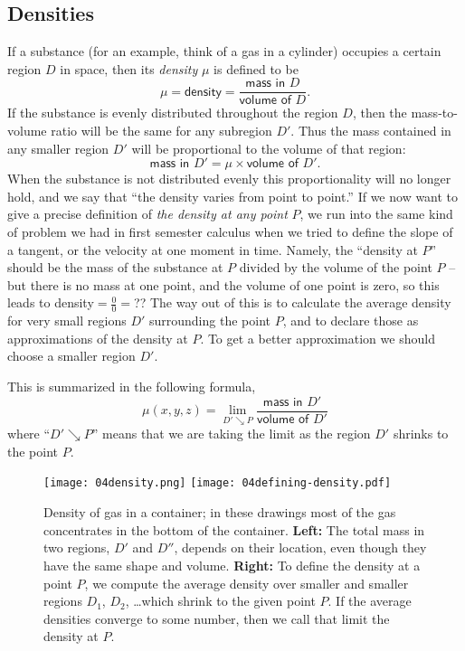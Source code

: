 \subsection{Densities}  
If a substance (for an example, think of a gas in a cylinder) occupies
a certain region $D$ in space, then its \emph{density} $\mu$ is defined to
be 
\[
\mu = \textsf{density} = \frac{\textsf{mass in }D}{\textsf{volume of }D}.
\]
If the substance is evenly distributed throughout the region
$D$, then the mass-to-volume ratio will be the same for any subregion
$D'$.  Thus the mass contained in any smaller region $D'$ will be
proportional to the volume of that region:
\[
\textsf{mass in }D' = \mu \times \textsf{volume of }D'.
\]
When the substance is not distributed evenly this proportionality will
no longer hold, and we say that ``the density varies from point to point.''
If we now want to give a precise definition of \emph{the density at any point}
$P$, we run into the same kind of problem we had in first semester
calculus when we tried to define
the slope of a tangent, or the velocity at one moment in time.  Namely, 
the ``density at $P$'' should be the mass of the substance at $P$ divided
by the volume of the point $P$ -- but there is no mass at one point, and the
volume of one point is zero, so this leads to density$=\frac{0}{0}=$??
The way out of this is to calculate the average density for very small
regions $D'$ surrounding the point $P$, and to declare those as
approximations of the density at $P$.
To get a better approximation we should choose a smaller region $D'$.

This is summarized in the following formula, 
\begin{equation}
  \mu(x, y, z) 
  = 
  \lim_{D'\searrow P}
  \frac{\textsf{mass in }D'}{\textsf{volume of }D'}
  \label{eq:04density-defined}
\end{equation}
where ``$D'\searrow P$'' means that we are taking the limit as the region
$D'$ shrinks to the point $P$.
\begin{figure}[ht]
  \texttt{[image: 04density.png]}
  \texttt{[image: 04defining-density.pdf]}
  \caption{
  Density of gas in a container; in these drawings most of the
  gas concentrates in the bottom of the container.
  \textbf{Left: } 
  The total mass in two regions, $D'$ and $D''$, depends on their
  location, even though they have the same shape and volume. 
  \textbf{Right:} To define the density at a point $P$, we compute
  the average density over smaller and smaller regions $D_1$, $D_2$,
  \dots which shrink to the given point $P$.  If the average
  densities converge to some number, then we call that limit the
  density at $P$.}
\end{figure}

